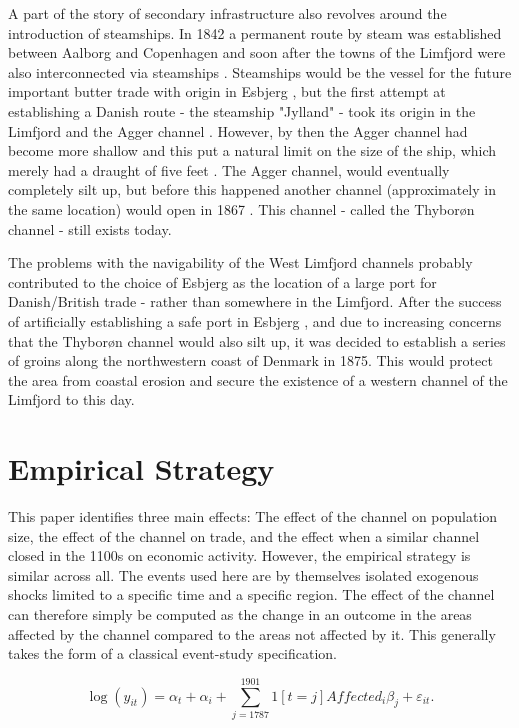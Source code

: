 \documentclass[11pt]{article}
\begin{document}
A part of the story of secondary infrastructure also revolves around the introduction of steamships. In 1842 a permanent route by steam was established between Aalborg and Copenhagen and soon after the towns of the Limfjord were also interconnected via steamships \citep{Klem1967}. Steamships would be the vessel for the future important butter trade with origin in Esbjerg \citep{Lampe2015DanesUK}, but the first attempt at establishing a Danish route - the steamship "Jylland" - took its origin in the Limfjord and the Agger channel \citep{Schovelin1891, p. 62}. However, by then the Agger channel had become more shallow and this put a natural limit on the size of the ship, which merely had a draught of five feet \citep{Lassen1883}. The Agger channel, would eventually completely silt up, but before this happened another channel (approximately in the same location) would open in 1867 \citep{Petersen1877}. This channel - called the Thyborøn channel - still exists today.

The problems with the navigability of the West Limfjord channels probably contributed to the choice of Esbjerg as the location of a large port for Danish/British trade - rather than somewhere in the Limfjord. After the success of artificially establishing a safe port in Esbjerg \citep{Lampe2015DanesUK}, and due to increasing concerns that the Thyborøn channel would also silt up, it was decided to establish a series of groins along the northwestern coast of Denmark in 1875. This would protect the area from coastal erosion and secure the existence of a western channel of the Limfjord to this day.

\section{Empirical Strategy}
This paper identifies three main effects: The effect of the channel on population size, the effect of the channel on trade, and the effect when a similar channel closed in the 1100s on economic activity. However, the empirical strategy is similar across all. The events used here are by themselves isolated exogenous shocks limited to a specific time and a specific region. The effect of the channel can therefore simply be computed as the change in an outcome in the areas affected by the channel compared to the areas not affected by it. This generally takes the form of a classical event-study specification.

\begin{equation}
\label{eq:eq501}
\log(y_{it})= \alpha_t + \alpha_i + \sum_{j=1787}^{1901} 1[t=j]Affected_{i}\beta_{j} + \varepsilon_{it}.
\end{equation}
\end{document}
